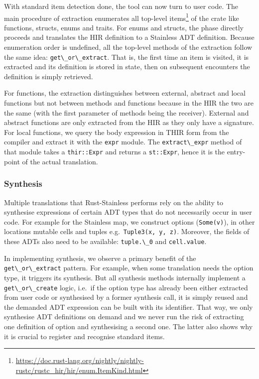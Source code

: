 With standard item detection done, the tool can now turn to user code.
The main procedure of extraction enumerates all top-level
items\footnote{\url{https://doc.rust-lang.org/nightly/nightly-rustc/rustc_hir/hir/enum.ItemKind.html}}
of the crate like functions, structs, enums and traits. For enums and
structs, the phase directly proceeds and translates the HIR definition
to a Stainless ADT definition. Because enumeration order is undefined,
all the top-level methods of the extraction follow the same idea:
\passthrough{\lstinline!get\_or\_extract!}. That is, the first time an
item is visited, it is extracted and its definition is stored in state,
then on subsequent encounters the definition is simply retrieved.

For functions, the extraction distinguishes between external, abstract
and local functions but not between methods and functions because in the
HIR the two are the same (with the first parameter of methods being the
receiver). External and abstract functions are only extracted from the
HIR as they only have a signature. For local functions, we query the
body expression in THIR form from the compiler and extract it with the
\passthrough{\lstinline!expr!} module. The
\passthrough{\lstinline!extract\_expr!} method of that module takes a
\passthrough{\lstinline!thir::Expr!} and returns a
\passthrough{\lstinline!st::Expr!}, hence it is the entry-point of the
actual translation.

\subsubsection{Synthesis}

Multiple translations that Rust-Stainless performs rely on the ability
to synthesise expressions of certain ADT types that do not necessarily
occur in user code. For example for the Stainless map, we construct
options (\passthrough{\lstinline!Some(v)!}), in other locations mutable
cells and tuples e.g.~\passthrough{\lstinline!Tuple3(x, y, z)!}.
Moreover, the fields of these ADTs also need to be available:
\passthrough{\lstinline!tuple.\_0!} and
\passthrough{\lstinline!cell.value!}.

In implementing synthesis, we observe a primary benefit of the
\passthrough{\lstinline!get\_or\_extract!} pattern. For example, when
some translation needs the option type, it triggers its synthesis.
But all synthesis methods internally implement a
\passthrough{\lstinline!get\_or\_create!} logic, i.e.~if the option type
has already been either extracted from user code or synthesised by a
former synthesis call, it is simply reused and the demanded ADT
expression can be built with its identifier. That way, we only
synthesise ADT definitions on demand and we never run the risk of
extracting one definition of option and synthesising a second one. The
latter also shows why it is crucial to register and recognise standard
items.

